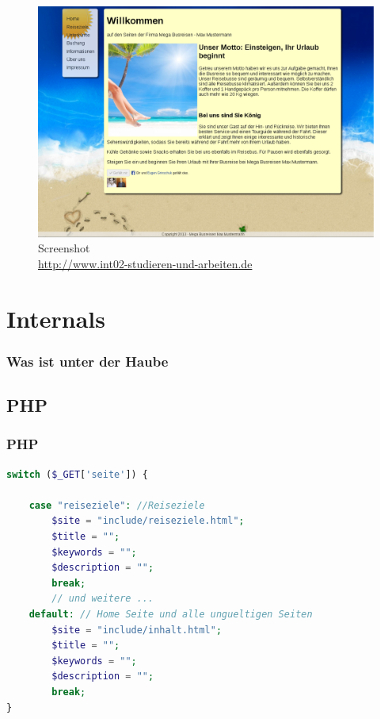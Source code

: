 \documentclass[xcolor=dvipsnames]{beamer}
\begin{document}
\begin{frame}
	\begin{figure}
	\includegraphics[scale=0.4]{screenshot_website.png}
	\caption{Screenshot \\ \tiny{\textcolor{gray}				{\url{http://www.int02-studieren-und-arbeiten.de}}}}
	\end{figure}
\end{frame}

\section{Internals}
\begin{frame} %
  \frametitle{Was ist unter der Haube} %
\end{frame}

\subsection{PHP}
\begin{frame}[fragile]
\frametitle{PHP}

\begin{lstlisting}[language=PHP]
switch ($_GET['seite']) {

    case "reiseziele": //Reiseziele
        $site = "include/reiseziele.html";
        $title = "";
        $keywords = "";
        $description = "";
        break;
        // und weitere ...
    default: // Home Seite und alle ungueltigen Seiten
        $site = "include/inhalt.html";
        $title = "";
        $keywords = "";
        $description = "";
        break;
}

\end{lstlisting}
\end{frame}
\end{document}
